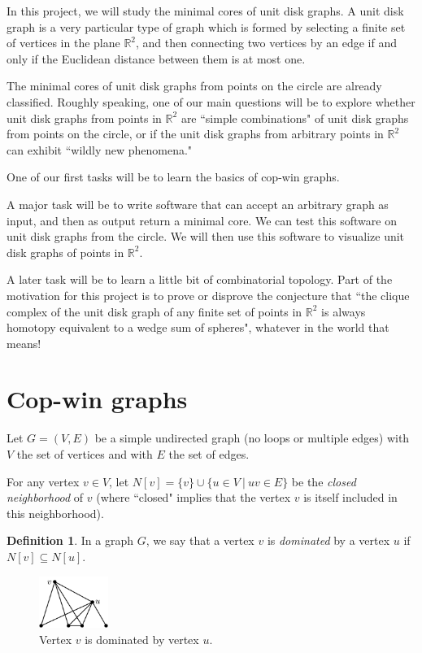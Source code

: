 \documentclass[amscd, amssymb, verbatim]{amsart}[12pt]
\theoremstyle{plain}
\theoremstyle{definition}
\newtheorem{definition}[lemma]{Definition}
\newcommand{\R}{\mathbb{R}}
\begin{document}
In this project, we will study the minimal cores of unit disk graphs.
A unit disk graph is a very particular type of graph which is formed by selecting a finite set of vertices in the plane $\R^2$, and then connecting two vertices by an edge if and only if the Euclidean distance between them is at most one.

The minimal cores of unit disk graphs from points on the circle are already classified.
Roughly speaking, one of our main questions will be to explore whether unit disk graphs from points in $\R^2$ are ``simple combinations" of unit disk graphs from points on the circle, or if the unit disk graphs from arbitrary points in $\R^2$ can exhibit ``wildly new phenomena."

One of our first tasks will be to learn the basics of cop-win graphs.

A major task will be to write software that can accept an arbitrary graph as input, and then as output return a minimal core.
We can test this software on unit disk graphs from the circle.
We will then use this software to visualize unit disk graphs of points in $\R^2$.

A later task will be to learn a little bit of combinatorial topology.
Part of the motivation for this project is to prove or disprove the conjecture that ``the clique complex of the unit disk graph of any finite set of points in $\R^2$ is always homotopy equivalent to a wedge sum of spheres", whatever in the world that means!

\cite{Bjorner1995,Carlsson2009,EdelsbrunnerHarer,edelsbrunner2000topological,Hatcher,Hausmann1995}

\section{Cop-win graphs}\label{sec:cop-win}

Let $G=(V,E)$ be a simple undirected graph (no loops or multiple edges) with $V$ the set of vertices and with $E$ the set of edges.

For any vertex $v\in V$, let $N[v]=\{v\}\cup\{u\in V~|~uv\in E\}$ be the \emph{closed neighborhood} of $v$ (where ``closed" implies that the vertex $v$ is itself included in this neighborhood).
\begin{definition}\label{def:dominated}
In a graph $G$, we say that a vertex $v$ is \emph{dominated} by a vertex $u$ if $N[v]\subseteq N[u]$.
\end{definition}

\begin{figure}[h]
\centering
\includegraphics[width=0.2\textwidth]{Dominated1_labeled.pdf}
\caption{Vertex $v$ is dominated by vertex $u$.}
\label{fig:dominated}
\end{figure}
\end{document}
